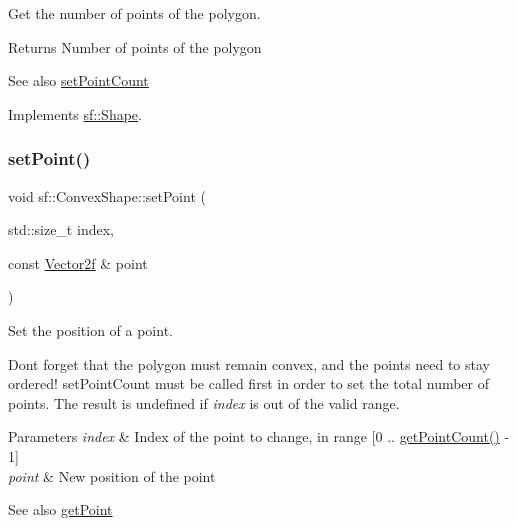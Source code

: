 Get the number of points of the polygon. 

\begin{DoxyReturn}{Returns}
Number of points of the polygon
\end{DoxyReturn}
\begin{DoxySeeAlso}{See also}
\mbox{\hyperlink{classsf_1_1_convex_shape_a56e6e79ade6dd651cc1a0e39cb68deae}{set\+Point\+Count}} \begin{DoxyVerb}\end{DoxyVerb}
 
\end{DoxySeeAlso}


Implements \mbox{\hyperlink{classsf_1_1_shape_af988dd61a29803fc04d02198e44b5643}{sf\+::\+Shape}}.

\mbox{\label{classsf_1_1_convex_shape_a5929e0ab0ba5ca1f102b40c234a8e92d}} 
\subsubsection{\texorpdfstring{setPoint()}{setPoint()}}
{\footnotesize\ttfamily void sf\+::\+Convex\+Shape\+::set\+Point (\begin{DoxyParamCaption}\item[{std\+::size\+\_\+t}]{index,  }\item[{const \mbox{\hyperlink{classsf_1_1_vector2}{Vector2f}} \&}]{point }\end{DoxyParamCaption})}



Set the position of a point. 

Don\textquotesingle{}t forget that the polygon must remain convex, and the points need to stay ordered! set\+Point\+Count must be called first in order to set the total number of points. The result is undefined if {\itshape index} is out of the valid range.


\begin{DoxyParams}{Parameters}
{\em index} & Index of the point to change, in range \mbox{[}0 .. \mbox{\hyperlink{classsf_1_1_convex_shape_a0c54b8d48fe4e13414f6e667dbfc22a3}{get\+Point\+Count()}} -\/ 1\mbox{]} \\
\hline
{\em point} & New position of the point\\
\hline
\end{DoxyParams}
\begin{DoxySeeAlso}{See also}
\mbox{\hyperlink{classsf_1_1_convex_shape_a72a97bc426d8daf4d682a20fcb7f3fe7}{get\+Point}} \begin{DoxyVerb}\end{DoxyVerb}
 
\end{DoxySeeAlso}
\mbox{\label{classsf_1_1_convex_shape_a56e6e79ade6dd651cc1a0e39cb68deae}} 
